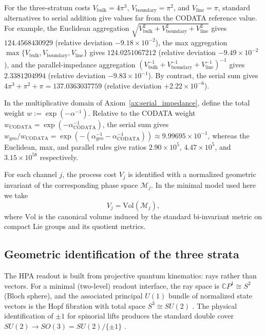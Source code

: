 \begin{remark}\label{rem:alpha_aggregation_isolation}
For the three-stratum costs $V_{\mathrm{bulk}}=4\pi^3$, $V_{\mathrm{boundary}}=\pi^2$, and $V_{\mathrm{line}}=\pi$, standard alternatives to serial addition give values far from the CODATA reference value. For example, the Euclidean aggregation $\sqrt{V_{\mathrm{bulk}}^2+V_{\mathrm{boundary}}^2+V_{\mathrm{line}}^2}$ gives $124.4568430929$ (relative deviation $-9.18\times 10^{-2}$), the max aggregation $\max\{V_{\mathrm{bulk}},V_{\mathrm{boundary}},V_{\mathrm{line}}\}$ gives $124.0251067212$ (relative deviation $-9.49\times 10^{-2}$), and the parallel-impedance aggregation $(V_{\mathrm{bulk}}^{-1}+V_{\mathrm{boundary}}^{-1}+V_{\mathrm{line}}^{-1})^{-1}$ gives $2.3381204994$ (relative deviation $-9.83\times 10^{-1}$). By contrast, the serial sum gives $4\pi^3+\pi^2+\pi=137.0363037759$ (relative deviation $+2.22\times 10^{-6}$).

In the multiplicative domain of Axiom~\ref{ax:serial_impedance}, define the total weight $w:=\exp(-\alpha^{-1})$. Relative to the CODATA weight $w_{\mathrm{CODATA}}=\exp(-\alpha_{\mathrm{CODATA}}^{-1})$, the serial sum gives $w_{\mathrm{geo}}/w_{\mathrm{CODATA}}=\exp(-(\alpha_{\mathrm{geo}}^{-1}-\alpha_{\mathrm{CODATA}}^{-1}))\approx 9.99695\times 10^{-1}$, whereas the Euclidean, max, and parallel rules give ratios $2.90\times 10^{5}$, $4.47\times 10^{5}$, and $3.15\times 10^{58}$ respectively.
\end{remark}

\begin{axiom}
\label{ax:impedance_volume}
For each channel $j$, the process cost $V_j$ is identified with a normalized geometric invariant of the corresponding phase space $\mathcal{M}_j$. In the minimal model used here we take
\begin{equation}
V_j = \mathrm{Vol}(\mathcal{M}_j),
\end{equation}
where $\mathrm{Vol}$ is the canonical volume induced by the standard bi-invariant metric on compact Lie groups and its quotient metrics.
\end{axiom}

\subsection{Geometric identification of the three strata}
The HPA readout is built from projective quantum kinematics: rays rather than vectors. For a minimal (two-level) readout interface, the ray space is $\mathbb{C}P^1\cong S^2$ (Bloch sphere), and the associated principal $U(1)$ bundle of normalized state vectors is the Hopf fibration with total space $S^3\cong SU(2)$ \cite{Nakahara2003,BengtssonZyczkowski2017}. The physical identification of $\pm 1$ for spinorial lifts produces the standard double cover $SU(2)\to SO(3)=SU(2)/\{\pm 1\}$ \cite{Hall2015}.

